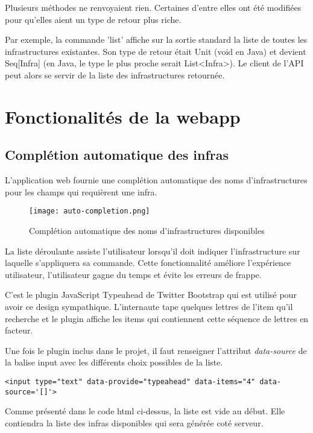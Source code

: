 Plusieurs méthodes ne renvoyaient rien. Certaines d'entre elles ont été
modifiées pour qu'elles aient un type de retour plus riche.

Par exemple, la commande 'list' affiche sur la sortie standard la liste de
toutes les infrastructures existantes.
Son type de retour était Unit (void en Java) et devient Seq[Infra] (en Java, le
type le plus proche serait List<Infra>).
Le client de l'API peut alors se servir de la liste des infrastructures retournée.

\section{Fonctionalités de la webapp}

\subsection{Complétion automatique des infras}

L'application web fournie une complétion automatique des noms d'infrastructures
pour les champs qui requièrent une infra.

\begin{figure}[H]
  \texttt{[image: auto-completion.png]}
  \caption{Complétion automatique des noms d'infrastructures disponibles}
\end{figure}

La liste déroulante assiste l'utilisateur lorsqu'il doit indiquer
l'infrastructure sur laquelle s'appliquera sa commande.
Cette fonctionnalité améliore l'expérience utilisateur, l'utilisateur gagne du
temps et évite les erreurs de frappe.

C'est le plugin JavaScript Typeahead de Twitter Bootstrap qui est utilisé pour
avoir ce design sympathique. L'internaute tape quelques lettres de l'item qu'il
recherche et le plugin affiche les items qui contiennent cette séquence de
lettres en facteur.

Une fois le plugin inclus dans le projet, il faut renseigner l'attribut
\textit{data-source} de la balise input avec les différents choix possibles de
la liste.

\lstset{language=XML}
\begin{lstlisting}[caption=utilisation de bootstrap-typeahead]
  <input type="text" data-provide="typeahead" data-items="4" data-source='[]'>
\end{lstlisting}

Comme présenté dans le code html ci-dessus, la liste est vide au début.
Elle contiendra la liste des infras disponibles qui sera générée coté serveur.

